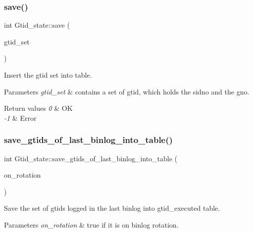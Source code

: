 \subsubsection{\texorpdfstring{save()}{save()}\hspace{0.1cm}{\footnotesize\ttfamily [2/2]}}
{\footnotesize\ttfamily int Gtid\+\_\+state\+::save (\begin{DoxyParamCaption}\item[{const \mbox{\hyperlink{classGtid__set}{Gtid\+\_\+set}} $\ast$}]{gtid\+\_\+set }\end{DoxyParamCaption})}

Insert the gtid set into table.


\begin{DoxyParams}{Parameters}
{\em gtid\+\_\+set} & contains a set of gtid, which holds the sidno and the gno.\\
\hline
\end{DoxyParams}

\begin{DoxyRetVals}{Return values}
{\em 0} & OK \\
\hline
{\em -\/1} & Error \\
\hline
\end{DoxyRetVals}
\mbox{\label{classGtid__state_a8716c3a617dc4805a1d08ee7e77f3abb}} 
\subsubsection{\texorpdfstring{save\+\_\+gtids\+\_\+of\+\_\+last\+\_\+binlog\+\_\+into\+\_\+table()}{save\_gtids\_of\_last\_binlog\_into\_table()}}
{\footnotesize\ttfamily int Gtid\+\_\+state\+::save\+\_\+gtids\+\_\+of\+\_\+last\+\_\+binlog\+\_\+into\+\_\+table (\begin{DoxyParamCaption}\item[{bool}]{on\+\_\+rotation }\end{DoxyParamCaption})}

Save the set of gtids logged in the last binlog into gtid\+\_\+executed table.


\begin{DoxyParams}{Parameters}
{\em on\+\_\+rotation} & true if it is on binlog rotation.\\
\hline
\end{DoxyParams}

